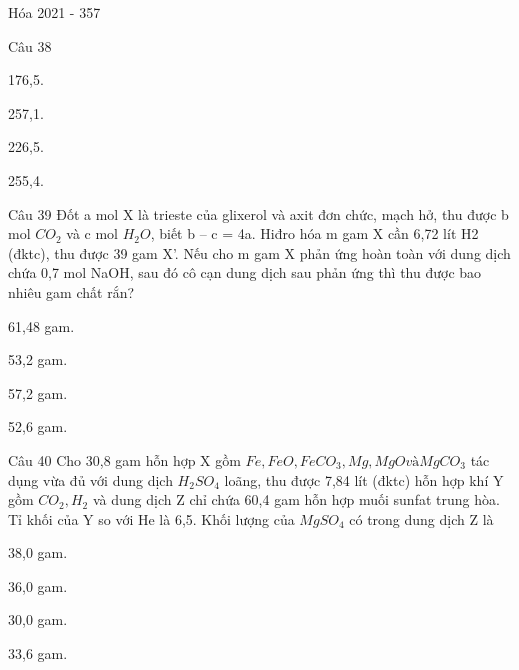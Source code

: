 \documentclass{book}
\begin{document}
\begin{quiz}{Hóa 2021 - 357}
\begin{multi}[points=1]{Câu 38}
\item  176,5.	
\item  257,1.	
\item*  226,5.	
\item  255,4.
\end{multi}

\begin{multi}[points=1]{Câu 39}
 Đốt a mol X là trieste của glixerol và axit đơn chức, mạch hở, thu được b mol $CO_2$ và c mol $H_2O$, biết b – c = 4a. Hiđro hóa m gam X cần 6,72 lít H2 (đktc), thu được 39 gam X’. Nếu cho m gam X phản ứng hoàn toàn với dung dịch chứa 0,7 mol NaOH, sau đó cô cạn dung dịch sau phản ứng thì thu được bao nhiêu gam chất rắn? 

\item  61,48 gam.	
\item  53,2 gam.	
\item  57,2 gam.	
\item*  52,6 gam.
\end{multi}

\begin{multi}[points=1]{Câu 40}
 Cho 30,8 gam hỗn hợp X gồm $Fe, FeO, FeCO_3, Mg, MgO và MgCO_3$ tác dụng vừa đủ với dung dịch $H_2SO_4$ loãng, thu được 7,84 lít (đktc) hỗn hợp khí Y gồm $CO_2, H_2$ và dung dịch Z chỉ chứa 60,4 gam hỗn hợp muối sunfat trung hòa. Tỉ khối của Y so với He là 6,5. Khối lượng của $MgSO_4$ có trong dung dịch Z là

\item  38,0 gam.	
\item  36,0 gam.	
\item*  30,0 gam.	
\item  33,6 gam.
\end{multi}

\end{quiz}
\end{document}
